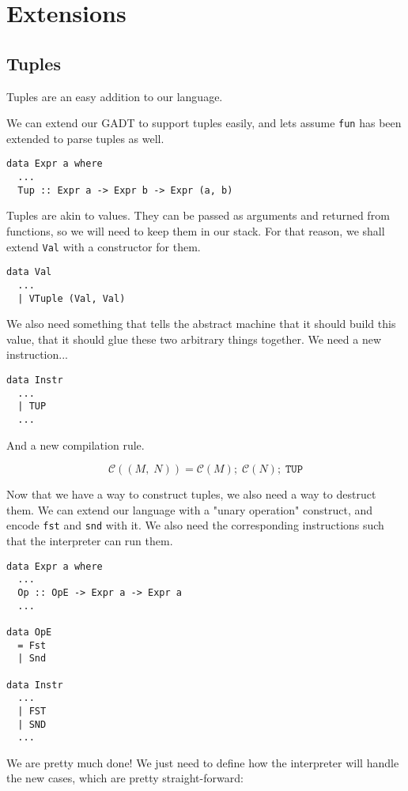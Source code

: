 \section{Extensions}
\subsection{Tuples}
Tuples are an easy addition to our language.

We can extend our GADT to support tuples easily, and lets assume \texttt{fun} has been extended to parse 
tuples as well.

\begin{lstlisting}
data Expr a where
  ...
  Tup :: Expr a -> Expr b -> Expr (a, b)
\end{lstlisting}

Tuples are akin to values. They can be passed as arguments and returned from functions, so we will need
to keep them in our stack. For that reason, we shall extend \texttt{Val} with a constructor for them.

\begin{lstlisting}
data Val
  ...
  | VTuple (Val, Val)
\end{lstlisting}

We also need something that tells the abstract machine that it should build this value, that it should
glue these two arbitrary things together. We need a new instruction...

\begin{lstlisting}
data Instr
  ...
  | TUP
  ...
\end{lstlisting}

And a new compilation rule.

\[ \mathcal{C}((M,\; N)) = \mathcal{C}(M);\; \mathcal{C}(N);\; \texttt{TUP} \]

Now that we have a way to construct tuples, we also need a way to destruct them. We can extend our language
with a "unary operation" construct, and encode \texttt{fst} and \texttt{snd} with it. We also need the corresponding
instructions such that the interpreter can run them.

\begin{lstlisting}
data Expr a where
  ...
  Op :: OpE -> Expr a -> Expr a
  ...

data OpE
  = Fst
  | Snd

data Instr
  ...
  | FST
  | SND
  ...
\end{lstlisting}

We are pretty much done! We just need to define how the interpreter will handle the new cases, which are pretty straight-forward:


